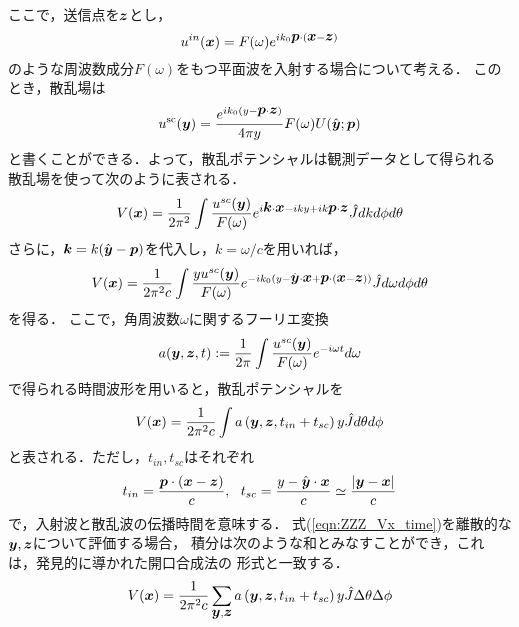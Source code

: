 ここで，送信点を$\mbox{\boldmath $z$}$とし，
\begin{equation}
	u^{in}(\mbox{\boldmath $x$})= F(\omega) e^{ik_0\mbox{\boldmath $p$}\cdot(\mbox{\boldmath $x$}-\mbox{\boldmath $z$})}
	\label{eqn:ZZZ_32}
\end{equation}
のような周波数成分$F(\omega)$をもつ平面波を入射する場合について考える．
このとき，散乱場は
\begin{equation}
	u^{\rm sc}(\mbox{\boldmath $y$})= \frac{e^{ik_0(y-\mbox{\boldmath $p$}\cdot \mbox{\boldmath $z$})}}{4\pi y }F(\omega)U(\hat{\mbox{\boldmath $y$}};\mbox{\boldmath $p$}) 
	\label{eqn:ZZZ_33}
\end{equation}
と書くことができる．よって，散乱ポテンシャルは観測データとして得られる
散乱場を使って次のように表される．
\begin{equation}
	V(\mbox{\boldmath $x$}) =\frac{1}{2\pi^2} \int \frac{u^{sc}(\mbox{\boldmath $y$})}{F(\omega)}
	e^{i\mbox{\boldmath $k$}\cdot \mbox{\boldmath $x$}-iky+ik\mbox{\boldmath $p$}\cdot\mbox{\boldmath $z$}}
	\hat{J} dkd\phi d\theta	
	\label{eqn:ZZZ_34}
\end{equation}
さらに，$\mbox{\boldmath $k$}=k(\hat{\mbox{\boldmath $y$}}-\mbox{\boldmath $p$})$を代入し，$k=\omega/c$を用いれば，
\begin{equation}
	V(\mbox{\boldmath $x$}) =\frac{1}{2\pi^2c} \int \frac{yu^{sc}(\mbox{\boldmath $y$})}{F(\omega)}
	e^{-ik_0(y-\hat{\mbox{\boldmath $y$}}\cdot\mbox{\boldmath $x$}+\mbox{\boldmath $p$}\cdot(\mbox{\boldmath $x$}-\mbox{\boldmath $z$})) }
	\hat{J} d\omega d\phi d\theta	
	\label{eqn:ZZZ_35}
\end{equation}
を得る．
ここで，角周波数$\omega$に関するフーリエ変換
\begin{equation}
	a(\mbox{\boldmath $y$},\mbox{\boldmath $z$},t):=\frac{1}{2\pi} \int \frac{u^{sc}(\mbox{\boldmath $y$})}{F(\omega)}e^{-i\omega t}d\omega
	\label{eqn:ZZZ_36}
\end{equation}
で得られる時間波形を用いると，散乱ポテンシャルを
\begin{equation}
	V(\mbox{\boldmath $x$}) =\frac{1}{2\pi^2c} \int a\left(\mbox{\boldmath $y$}, \mbox{\boldmath $z$}, t_{in}+t_{sc} \right) y \hat{J} d\theta d\phi
	\label{eqn:ZZZ_Vx_time}
\end{equation}
と表される．ただし，$t_{in},t_{sc}$はそれぞれ
\begin{equation}
	t_{in}=\frac{\fat{p}\cdot \left( \fat{x}-\fat{z}\right)}{c}, \ \ 
	t_{sc}=
	\frac{ y-\hat{\fat{y}}\cdot \fat{x} }{c} \simeq 
	\frac{\left|\fat{y}-\fat{x}\right|}{c} 
	\label{eqn:ZZZ_37}
\end{equation}
で，入射波と散乱波の伝播時間を意味する．
式(\ref{eqn:ZZZ_Vx_time})を離散的な$\mbox{\boldmath $y$},\mbox{\boldmath $z$}$について評価する場合，
積分は次のような和とみなすことができ，これは，発見的に導かれた開口合成法の
形式と一致する．
\begin{equation}
	V(\mbox{\boldmath $x$}) = 
	\frac{1}{2\pi^2c} 
	\sum_{\mbox{\boldmath $y$},\mbox{\boldmath $z$}} 
	a\left(\mbox{\boldmath $y$}, \mbox{\boldmath $z$}, t_{in}+t_{sc} \right) y \hat{J} \Delta \theta \Delta \phi
	\label{eqn:ZZZ_38}
\end{equation}

